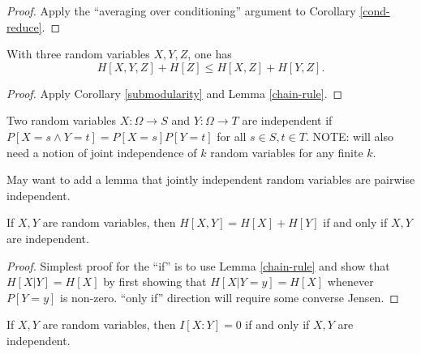 \begin{proof}  Apply the ``averaging over conditioning'' argument to Corollary \ref{cond-reduce}.
\end{proof}

\begin{corollary}\label{alt-submodularity}
  \leanok
  With three random variables $X,Y,Z$, one has
  $$ H[X,Y,Z] + H[Z] \leq H[X,Z] + H[Y,Z].$$
\end{corollary}

\begin{proof}   Apply Corollary \ref{submodularity} and Lemma \ref{chain-rule}.
\end{proof}

\begin{definition}
  \label{independent-def}
  \leanok
  Two random variables $X: \Omega \to S$ and $Y: \Omega \to T$ are independent if $P[ X = s \wedge Y = t] = P[X=s] P[Y=t]$ for all $s \in S, t \in T$.  NOTE: will also need a notion of joint independence of $k$ random variables for any finite $k$.
\end{definition}

May want to add a lemma that jointly independent random variables are pairwise independent.

\begin{lemma}\label{add-entropy}
  \leanok
  If $X,Y$ are random variables, then $H[X,Y] = H[X] + H[Y]$ if and only if $X,Y$ are independent.
\end{lemma}

\begin{proof}  Simplest proof for the ``if'' is to use Lemma \ref{chain-rule} and show that $H[X|Y] = H[X]$ by first showing that $H[X|Y=y] = H[X]$ whenever $P[Y=y]$ is non-zero.  ``only if'' direction will require some converse Jensen.
\end{proof}


\begin{corollary}
\label{vanish-entropy}
\leanok
If $X,Y$ are random variables, then $I[X:Y] = 0$ if and only if $X,Y$ are independent.
\end{corollary}

